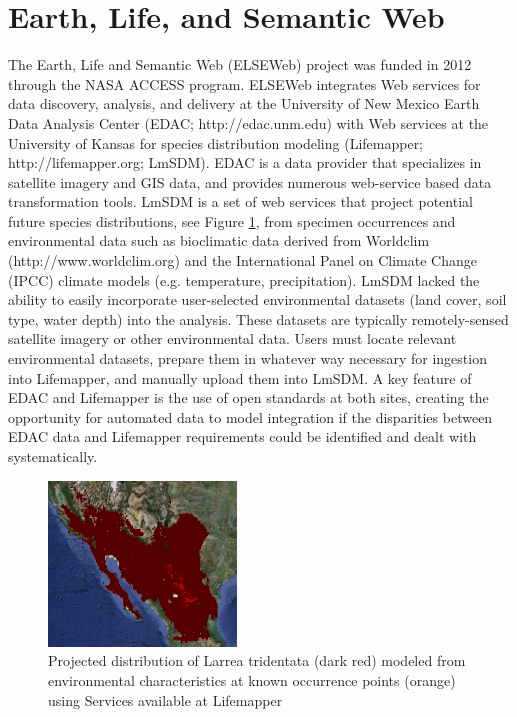 \documentclass[letterpaper]{article}
\begin{document}
\section{Earth, Life, and Semantic Web}
The Earth, Life and Semantic Web (ELSEWeb) project was funded in 2012 through the NASA ACCESS program. ELSEWeb integrates Web services for data discovery, analysis, and delivery at the University of New Mexico Earth Data Analysis Center (EDAC; http://edac.unm.edu) with Web services at the University of Kansas for species distribution modeling (Lifemapper; http://lifemapper.org; LmSDM). EDAC is a data provider that specializes in satellite imagery and GIS data, and provides numerous web-service based data transformation tools. LmSDM is a set of web services that project potential future species distributions, see Figure \ref{fig:lifemapper-model}, from specimen occurrences and environmental data such as bioclimatic data derived from Worldclim (http://www.worldclim.org) and the International Panel on Climate Change (IPCC) climate models (e.g. temperature, precipitation). LmSDM lacked the ability to easily incorporate user-selected environmental datasets (land cover, soil type, water depth) into the analysis. These datasets are typically remotely-sensed satellite imagery or other environmental data. Users must locate relevant environmental datasets, prepare them in whatever way necessary for ingestion into Lifemapper, and manually upload them into LmSDM. A key feature of EDAC and Lifemapper is the use of open standards at both sites, creating the opportunity for automated data to model integration if the disparities between EDAC data and Lifemapper requirements could be identified and dealt with systematically.

\begin{figure}
\center
\includegraphics[width=50mm]{images/lifemapper-model.png}
\caption{Projected distribution of Larrea tridentata (dark red) modeled from environmental characteristics at known occurrence points (orange) using Services available at Lifemapper}
\label{fig:lifemapper-model}
\end{figure}
\end{document}
